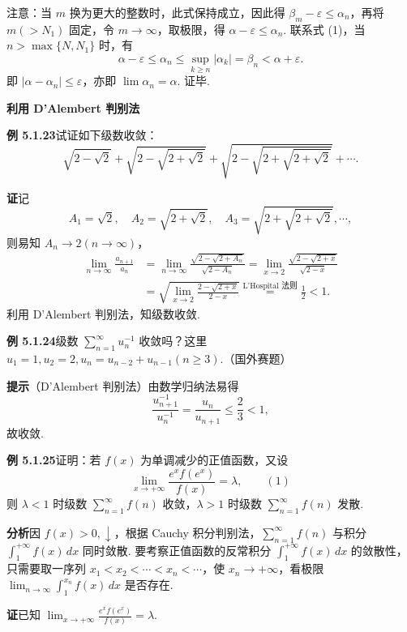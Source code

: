 \documentclass[UTF8, 12pt, fontset=fandol, oneside]{ctexart}
\begin{document}
注意：当 $m$ 换为更大的整数时，此式保持成立，因此得 $\beta_m-\varepsilon\le\alpha_n$，再将 $m(>N_1)$ 固定，令 $m\to\infty$，取极限，得 $\alpha-\varepsilon\le\alpha_n$. 联系式 (1)，当 $n>\max\{N,N_1\}$ 时，有
\[
  \alpha-\varepsilon\le\alpha_n\le\sup_{k\ge n}|\alpha_k|=\beta_n<\alpha+\varepsilon.
\]
即 $|\alpha-\alpha_n|\le\varepsilon$，亦即 $\lim\alpha_n=\alpha$. 证毕.

\noindent\textbf{利用 D'Alembert 判别法}

\noindent\textbf{例 5.1.23}\quad 试证如下级数收敛：
\[
  \sqrt{2-\sqrt2}+\sqrt{2-\sqrt{2+\sqrt2}}
  +\sqrt{2-\sqrt{2+\sqrt{2+\sqrt2}}}+\cdots.
\]

\noindent\textbf{证}\quad 记
\[
  A_1=\sqrt2,\quad A_2=\sqrt{2+\sqrt2},\quad
  A_3=\sqrt{2+\sqrt{2+\sqrt2}},\cdots,
\]
则易知 $A_n\to2(n\to\infty)$，
\[
\begin{aligned}
\lim_{n\to\infty}\frac{a_{n+1}}{a_n}
&=\lim_{n\to\infty}
\frac{\sqrt{2-\sqrt{2+A_n}}}{\sqrt{2-A_n}}
=\lim_{x\to2}\frac{\sqrt{2-\sqrt{2+x}}}{\sqrt{2-x}}\\
&=\sqrt{\lim_{x\to2}\frac{2-\sqrt{2+x}}{2-x}}
\stackrel{\text{L'Hospital 法则}}{=}\frac12<1.
\end{aligned}
\]
利用 D'Alembert 判别法，知级数收敛.

\noindent\textbf{例 5.1.24}\quad 级数 $\displaystyle\sum_{n=1}^\infty u_n^{-1}$ 收敛吗？这里 $u_1=1,u_2=2,u_n=u_{n-2}+u_{n-1}(n\ge3)$.（国外赛题）

\noindent\textbf{提示}\quad （D'Alembert 判别法）由数学归纳法易得
\[
  \frac{u_{n+1}^{-1}}{u_n^{-1}}=\frac{u_n}{u_{n+1}}\le\frac23<1,
\]
故收敛.

\noindent\textbf{例 5.1.25}\quad 证明：若 $f(x)$ 为单调减少的正值函数，又设
\[
  \lim_{x\to+\infty}\frac{e^xf(e^x)}{f(x)}=\lambda,
\qquad(1)
\]
则 $\lambda<1$ 时级数 $\displaystyle\sum_{n=1}^\infty f(n)$ 收敛，$\lambda>1$ 时级数 $\displaystyle\sum_{n=1}^\infty f(n)$ 发散.

\noindent\textbf{分析}\quad 因 $f(x)>0,\downarrow$，根据 Cauchy 积分判别法，$\displaystyle\sum_{n=1}^\infty f(n)$ 与积分 $\displaystyle\int_1^{+\infty}f(x)\,dx$ 同时敛散. 要考察正值函数的反常积分 $\displaystyle\int_1^{+\infty}f(x)\,dx$ 的敛散性，只需要取一序列 $x_1<x_2<\cdots<x_n<\cdots$，使 $x_n\to+\infty$，看极限 $\displaystyle\lim_{n\to\infty}\int_1^{x_n}f(x)\,dx$ 是否存在.

\noindent\textbf{证}\quad 已知 $\displaystyle\lim_{x\to+\infty}\frac{e^xf(e^x)}{f(x)}=\lambda$.
\end{document}
